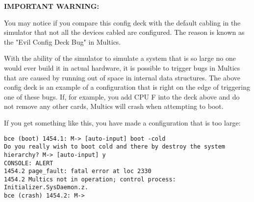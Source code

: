 \textbf{IMPORTANT WARNING:}

You may notice if you compare this config deck with the default cabling in the simulator that
not all the devices cabled are configured. The reason is known as the "Evil Config Deck Bug" in
Multics.

With the ability of the simulator to simulate a system that is so large no one would ever build
it in actual hardware, it is possible to trigger bugs in Multics that are caused by running out
of space in internal data structures. The above config deck is an example of a configuration that
is right on the edge of triggering one of these bugs. If, for example, you add CPU F into the deck
above and do not remove any other cards, Multics will crash when attempting to boot.

If you get something like this, you have made a configuration that is too large:

\begin{adjustwidth}{5ex}{1ex}
    \texttt{bce (boot) 1454.1: M-> [auto-input] boot -cold} \\
    \texttt{Do you really wish to boot cold and there by destroy the system hierarchy? M-> [auto-input] y} \\
    \texttt{CONSOLE: ALERT} \\
    \texttt{1454.2  page\_fault: fatal error at loc 2330} \\
    \texttt{1454.2  Multics not in operation; control process: Initializer.SysDaemon.z.} \\
    \texttt{bce (crash) 1454.2: M->} \\
\end{adjustwidth}

